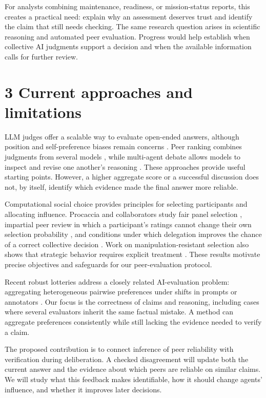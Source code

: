 \documentclass[12pt,letterpaper]{article}
\begin{document}
For analysts combining maintenance, readiness, or mission-status reports, this creates a practical need: explain why an assessment deserves trust and identify the claim that still needs checking. The same research question arises in scientific reasoning and automated peer evaluation. Progress would help establish when collective AI judgments support a decision and when the available information calls for further review.


\section*{3 Current approaches and limitations}
LLM judges offer a scalable way to evaluate open-ended answers, although position and self-preference biases remain concerns \cite{ref1}. Peer ranking combines judgments from several models \cite{ref2}, while multi-agent debate allows models to inspect and revise one another's reasoning \cite{ref3}. These approaches provide useful starting points. However, a higher aggregate score or a successful discussion does not, by itself, identify which evidence made the final answer more reliable.

Computational social choice provides principles for selecting participants and allocating influence. Procaccia and collaborators study fair panel selection \cite{ref4}, impartial peer review in which a participant's ratings cannot change their own selection probability \cite{ref5}, and conditions under which delegation improves the chance of a correct collective decision \cite{ref6}. Work on manipulation-resistant selection also shows that strategic behavior requires explicit treatment \cite{ref7}. These results motivate precise objectives and safeguards for our peer-evaluation protocol.

Recent robust lotteries address a closely related AI-evaluation problem: aggregating heterogeneous pairwise preferences under shifts in prompts or annotators \cite{ref8}. Our focus is the correctness of claims and reasoning, including cases where several evaluators inherit the same factual mistake. A method can aggregate preferences consistently while still lacking the evidence needed to verify a claim.

The proposed contribution is to connect inference of peer reliability with verification during deliberation. A checked disagreement will update both the current answer and the evidence about which peers are reliable on similar claims. We will study what this feedback makes identifiable, how it should change agents' influence, and whether it improves later decisions.
\end{document}
